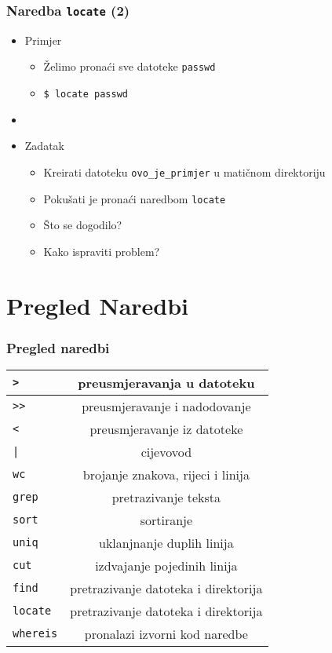 \documentclass{beamer}
\newcommand{\shell}[1]{\texttt{#1}}
\begin{document}
\begin{frame}[t]
\frametitle{Naredba \shell{locate} (2)}
\begin{itemize}
  \item Primjer
  \begin{itemize}
    \item Želimo pronaći sve datoteke \shell{passwd}
    \item[] \shell{\$ locate passwd}
  \end{itemize}
  \item[]
  \item Zadatak
  \begin{itemize}
      \item Kreirati datoteku \shell{ovo\_je\_primjer} u matičnom direktoriju
	  \item Pokušati je pronaći naredbom \shell{locate}
	  \item Što se dogodilo?
	  \item Kako ispraviti problem?
  \end{itemize}
\end{itemize}
\end{frame}


\section{Pregled Naredbi}

\begin{frame}[t]
\frametitle{Pregled naredbi}
\begin{tabular}{| l | c |} \hline
  \shell{>} & preusmjeravanja u datoteku \\ \hline
  \shell{>>} &  preusmjeravanje i nadodovanje\\ \hline
  \shell{<} & preusmjeravanje iz datoteke \\ \hline
  \shell{|} & cijevovod \\ \hline
  \shell{wc} & brojanje znakova, rijeci i linija \\ \hline
  \shell{grep} & pretrazivanje teksta \\ \hline
  \shell{sort} & sortiranje \\ \hline
  \shell{uniq} & uklanjnanje duplih linija \\ \hline
  \shell{cut} & izdvajanje pojedinih linija \\ \hline
  \shell{find} & pretrazivanje datoteka i direktorija \\ \hline
  \shell{locate} & pretrazivanje datoteka i direktorija \\ \hline
  \shell{whereis} & pronalazi izvorni kod naredbe \\ \hline
  

\end{tabular}
\end{frame}
\end{document}
